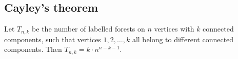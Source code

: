 \subsection{Cayley's theorem}
Let $T_{n, k}$ be the number of labelled forests on $n$ vertices with $k$ connected components, 
such that vertices $1, 2, \dots, k$ all belong to different connected components. 
Then $T_{n,k} = k \cdot n^{n - k - 1}$.
